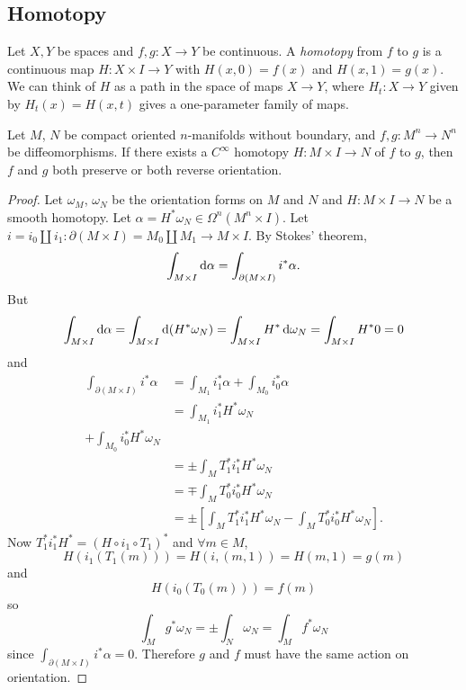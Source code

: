 \subsection{Homotopy}

\begin{defn}[Homotopy]
Let $X, Y$ be spaces and $f, g: X \to Y$ be continuous.
A \emph{homotopy} from $f$ to $g$ is a continuous map
$H: X \times I \to Y$ with $H(x, 0) = f(x)$ and
$H(x, 1) = g(x)$. We can think of $H$ as a path in the space of maps
$X \to Y$, where $H_t : X \to Y$ given by $H_t(x) = H(x, t)$ gives a
one-parameter family of maps.
\end{defn}

\begin{prop}
Let $M$, $N$ be compact oriented $n$-manifolds without boundary, and
$f, g : M^n \to N^n$ be diffeomorphisms. If there exists a $C^\infty$
homotopy $H : M \times I \to N$ of $f$ to $g$, then $f$ and $g$ both
preserve or both reverse orientation.
\end{prop}
\begin{proof}
Let $\omega_M$, $\omega_N$ be the orientation forms on $M$ and $N$ and
$H: M \times I \to N$ be a smooth homotopy. Let
$\alpha = H^\ast \omega_N \in \Omega^n(M^n \times I)$. Let
$i = i_0 \coprod i_1 : \partial (M \times I) = M_0 \coprod M_1  \to M
\times I$. By Stokes' theorem,
$$
  \int_{M \times I} \mathop{}\!\mathrm{d} \alpha
= \int_{\partial(M \times I)} i^\ast \alpha.
$$
But
$$
  \int_{M \times I}
    \mathop{}\!\mathrm{d} \alpha
= \int_{M \times I}
    \mathop{}\!\mathrm{d} (H^\ast \omega_N)
= \int_{M \times I}
    H^\ast \mathop{}\!\mathrm{d} \omega_N
= \int_{M \times I}
    H^\ast 0
= 0
$$
and
\begin{align*}
  \int_{\partial(M \times I)}
    i^\ast \alpha
&= \int_{M_1}
     i_1^\ast \alpha
 + \int_{M_0}
     i_0^\ast \alpha \\
&= \int_{M_1}
      i_1^\ast H^\ast \omega_N \\
 + \int_{M_0}
     i_0^\ast H^\ast \omega_N \\
&= \pm \int_M
     T_1^\ast i_1^\ast H^\ast \omega_N \\
&= \mp \int_M
     T_0^\ast i_0^\ast H^\ast \omega_N \\
&= \pm
     \left[
       \int_M
         T_1^\ast i_1^\ast H^\ast \omega_N
     - \int_M
         T_0^\ast i_0^\ast H^\ast \omega_N
     \right].
\end{align*}
Now $T_1^\ast i_1^\ast H^\ast = (H \circ i_1 \circ T_1)^\ast$
and $\forall m \in M$,
$$
  H(i_1(T_1(m)))
= H(i, (m, 1))
= H(m, 1)
= g(m)
$$
and
$$
  H(i_0(T_0(m))) = f(m)
$$
so
$$
  \int_M g^\ast \omega_N
= \pm \int_N \omega_N
= \int_M f^\ast \omega_N
$$
since $\int_{\partial(M \times I)} i^\ast \alpha = 0$. Therefore $g$
and $f$ must have the same action on orientation.
\end{proof}

